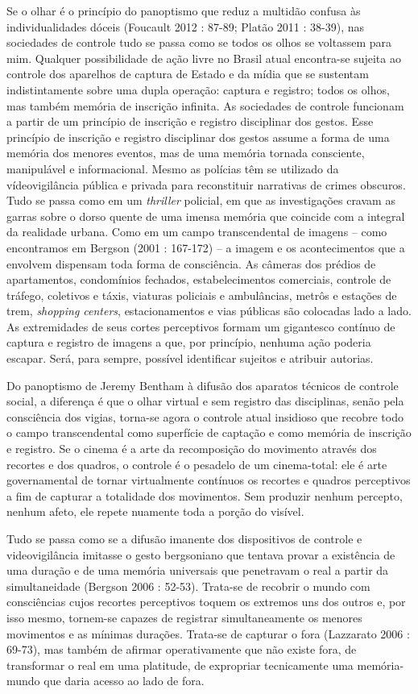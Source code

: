 Se o olhar é o princípio do panoptismo que reduz a multidão confusa às
individualidades dóceis (Foucault 2012 : 87-89; Platão 2011 : 38-39),
nas sociedades de controle tudo se passa como se todos os olhos se
voltassem para mim. Qualquer possibilidade de ação livre no Brasil atual
encontra-se sujeita ao controle dos aparelhos de captura de Estado e da
mídia que se sustentam indistintamente sobre uma dupla operação: captura
e registro; todos os olhos, mas também memória de inscrição infinita. As
sociedades de controle funcionam a partir de um princípio de inscrição e
registro disciplinar dos gestos. Esse princípio de inscrição e registro
disciplinar dos gestos assume a forma de uma memória dos menores
eventos, mas de uma memória tornada consciente, manipulável e
informacional. Mesmo as polícias têm se utilizado da vídeovigilância
pública e privada para reconstituir narrativas de crimes obscuros. Tudo
se passa como em um \emph{thriller }policial, em que as investigações
cravam as garras sobre o dorso quente de uma imensa memória que coincide
com a integral da realidade urbana. Como em um campo transcendental de
imagens -- como encontramos em Bergson (2001 : 167-172) -- a imagem e os
acontecimentos que a envolvem dispensam toda forma de consciência. As
câmeras dos prédios de apartamentos, condomínios fechados,
estabelecimentos comerciais, controle de tráfego, coletivos e táxis,
viaturas policiais e ambulâncias, metrôs e estações de trem,
\emph{shopping centers}, estacionamentos e vias públicas são colocadas
lado a lado. As extremidades de seus cortes perceptivos formam um
gigantesco contínuo de captura e registro de imagens a que, por
princípio, nenhuma ação poderia escapar. Será, para sempre, possível
identificar sujeitos e atribuir autorias.

Do panoptismo de Jeremy Bentham à difusão dos aparatos técnicos de
controle social, a diferença é que o olhar virtual e sem registro das
disciplinas, senão pela consciência dos vigias, torna-se agora o
controle atual insidioso que recobre todo o campo transcendental como
superfície de captação e como memória de inscrição e registro. Se o
cinema é a arte da recomposição do movimento através dos recortes e dos
quadros, o controle é o pesadelo de um cinema-total: ele é arte
governamental de tornar virtualmente contínuos os recortes e quadros
perceptivos a fim de capturar a totalidade dos movimentos. Sem produzir
nenhum percepto, nenhum afeto, ele repete nuamente toda a porção do
visível.

Tudo se passa como se a difusão imanente dos dispositivos de controle e
videovigilância imitasse o gesto bergsoniano que tentava provar a
existência de uma duração e de uma memória universais que penetravam o
real a partir da simultaneidade (Bergson 2006 : 52-53). Trata-se de
recobrir o mundo com consciências cujos recortes perceptivos toquem os
extremos uns dos outros e, por isso mesmo, tornem-se capazes de
registrar simultaneamente os menores movimentos e as mínimas durações.
Trata-se de capturar o fora (Lazzarato 2006 : 69-73), mas também de
afirmar operativamente que não existe fora, de transformar o real em uma
platitude, de expropriar tecnicamente uma memória-mundo que daria acesso
ao lado de fora.

